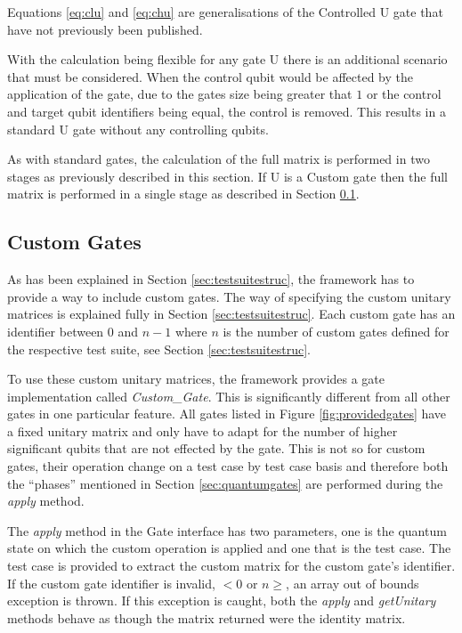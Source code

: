 Equations \ref{eq:clu} and \ref{eq:chu} are generalisations of the Controlled U gate that have not previously been published.

With the calculation being flexible for any gate U there is an additional  scenario that must be considered.
When the control qubit would be affected by the application of the gate, due to the gates size being greater that $1$ or the control and target qubit identifiers being equal, the control is removed.
This results in a standard U gate without any controlling qubits.

As with standard gates, the calculation of the full matrix is performed in two stages as previously described in this section.
If U is a Custom gate then the full matrix is performed in a single stage as described in Section \ref{sec:custgates}.

\subsection{Custom Gates}
\label{sec:custgates}

As has been explained in Section \ref{sec:testsuitestruc}, the framework has to provide a way to include custom gates.
The way of specifying the custom unitary matrices is explained fully in Section \ref{sec:testsuitestruc}.
Each custom gate has an identifier between $0$ and $n-1$ where $n$ is the number of custom gates defined for the respective test suite, see Section \ref{sec:testsuitestruc}.

To use these custom unitary matrices, the framework provides a gate implementation called \emph{Custom\_Gate}.
This is significantly different from all other gates in one particular feature.
All gates listed in Figure \ref{fig:providedgates} have a fixed unitary matrix and only have to adapt for the number of higher significant qubits that are not effected by the gate.
This is not so for custom gates, their operation change on a test case by test case basis and therefore both the ``phases'' mentioned in Section \ref{sec:quantumgates} are performed during the \emph{apply} method.

The \emph{apply} method in the Gate interface has two parameters, one is the quantum state on which the custom operation is applied and one that is the test case.
The test case is provided to extract the custom matrix for the custom gate's identifier.
If the custom gate identifier is invalid, $<0$ or $n\geq$, an array out of bounds exception is thrown.
If this exception is caught, both the \emph{apply} and \emph{getUnitary} methods behave as though the matrix returned were the identity matrix.

